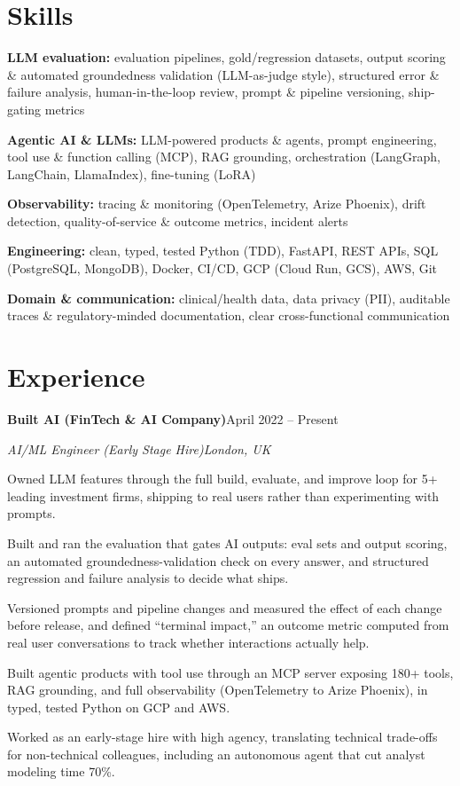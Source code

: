 \documentclass[10pt,a4paper]{article}
\newcommand{\entry}[4]{%
  {\color{company}\bfseries #1}\hfill {\color{muted}#2}\par
  \vspace{1pt}
  {\itshape #3}\hfill {\color{muted}\itshape #4}\par
  \vspace{3pt}%
}
\begin{document}
\section{Skills}
\begin{tight}
  \item[\textcolor{accent}{\small$\bullet$}] \textbf{LLM evaluation:} evaluation pipelines, gold/regression datasets, output scoring \& automated groundedness validation (LLM-as-judge style), structured error \& failure analysis, human-in-the-loop review, prompt \& pipeline versioning, ship-gating metrics
  \item[\textcolor{accent}{\small$\bullet$}] \textbf{Agentic AI \& LLMs:} LLM-powered products \& agents, prompt engineering, tool use \& function calling (MCP), RAG grounding, orchestration (LangGraph, LangChain, LlamaIndex), fine-tuning (LoRA)
  \item[\textcolor{accent}{\small$\bullet$}] \textbf{Observability:} tracing \& monitoring (OpenTelemetry, Arize Phoenix), drift detection, quality-of-service \& outcome metrics, incident alerts
  \item[\textcolor{accent}{\small$\bullet$}] \textbf{Engineering:} clean, typed, tested Python (TDD), FastAPI, REST APIs, SQL (PostgreSQL, MongoDB), Docker, CI/CD, GCP (Cloud Run, GCS), AWS, Git
  \item[\textcolor{accent}{\small$\bullet$}] \textbf{Domain \& communication:} clinical/health data, data privacy (PII), auditable traces \& regulatory-minded documentation, clear cross-functional communication
\end{tight}

\section{Experience}
\entry{Built AI (FinTech \& AI Company)}{April 2022 -- Present}{AI/ML Engineer (Early Stage Hire)}{London, UK}
\begin{tight}
  \item Owned LLM features through the full build, evaluate, and improve loop for 5+ leading investment firms, shipping to real users rather than experimenting with prompts.
  \item Built and ran the evaluation that gates AI outputs: eval sets and output scoring, an automated groundedness-validation check on every answer, and structured regression and failure analysis to decide what ships.
  \item Versioned prompts and pipeline changes and measured the effect of each change before release, and defined ``terminal impact,'' an outcome metric computed from real user conversations to track whether interactions actually help.
  \item Built agentic products with tool use through an MCP server exposing 180+ tools, RAG grounding, and full observability (OpenTelemetry to Arize Phoenix), in typed, tested Python on GCP and AWS.
  \item Worked as an early-stage hire with high agency, translating technical trade-offs for non-technical colleagues, including an autonomous agent that cut analyst modeling time 70\%.
\end{tight}
\end{document}
